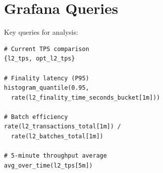 \documentclass[
]{elteikthesis}[2024/04/26]
\begin{document}
\section{Grafana Queries}

Key queries for analysis:

\begin{listing}[H]
    \begin{verbatim}
# Current TPS comparison
{l2_tps, opt_l2_tps}

# Finality latency (P95)
histogram_quantile(0.95, 
  rate(l2_finality_time_seconds_bucket[1m]))

# Batch efficiency
rate(l2_transactions_total[1m]) / 
  rate(l2_batches_total[1m])

# 5-minute throughput average
avg_over_time(l2_tps[5m])
    \end{verbatim}
    \caption{Grafana PromQL examples}
    \label{lst:grafana-queries}
\end{listing}

\cleardoublepage

{}
\printbibliography[title=\biblabel]
\cleardoublepage

{}
\listoffigures
\cleardoublepage

{}
\listoftables
\cleardoublepage

{}
\lstlistoflistings
\cleardoublepage
\end{document}
